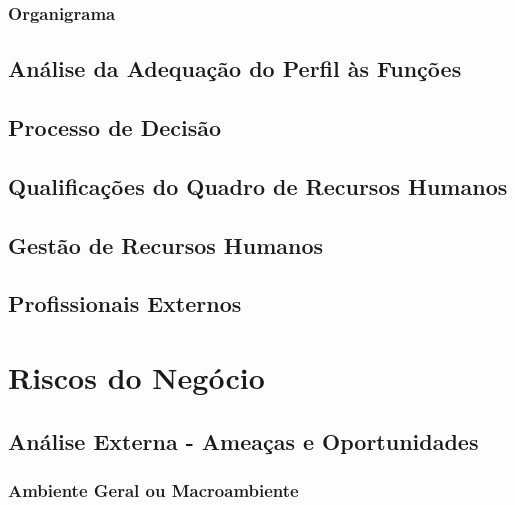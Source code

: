 \documentclass[11pt]{article}
\begin{document}
	\normalsize
	
	
	\large
	\subsubsection{Organigrama}
	
	\normalsize
	
	
	\large
	\subsection{Análise da Adequação do Perfil às Funções}
	
	\normalsize
	
	
	\large
	\subsection{Processo de Decisão}
	
	\normalsize
	
	
	\large
	\subsection{Qualificações do Quadro de Recursos Humanos}
	
	\normalsize
	
	
	\large
	\subsection{Gestão de Recursos Humanos}
	
	\normalsize
	
	
	\large
	\subsection{Profissionais Externos}
	
	\normalsize
	
	\pagebreak
	
	\large
	\section{Riscos do Negócio}
	
	\normalsize
	
	
	\large
	\subsection{Análise Externa - Ameaças e Oportunidades}
	
	\normalsize
	
	
	\large
	\subsubsection{Ambiente Geral ou Macroambiente}
	
\end{document}
